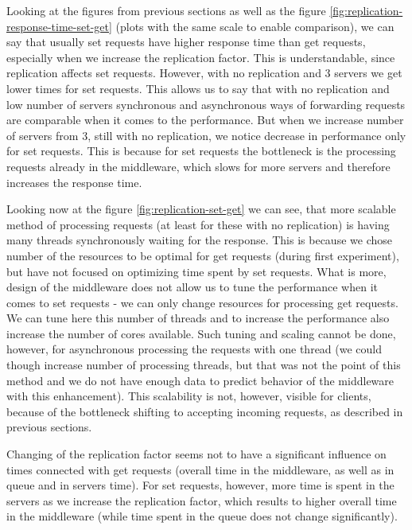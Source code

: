 \documentclass[11pt]{article}
\begin{document}
Looking at the figures from previous sections as well as the figure
\ref{fig:replication-response-time-set-get} (plots with the same scale to enable comparison), we can say that usually set requests have higher response time than get requests, especially when we increase the replication factor. This is understandable, since replication affects set requests. However, with no replication and 3 servers we get lower times for set requests. This allows us to say that with no replication and low number of servers synchronous and asynchronous ways of forwarding requests are comparable when it comes to the performance. But when we increase number of servers from 3, still with no replication, we notice decrease in performance only for set requests. This is because for set requests the bottleneck is the processing requests already in the middleware, which slows for more servers and therefore increases the response time. 

Looking now at the figure \ref{fig:replication-set-get} we can see, that more scalable method of processing requests (at least for these with no replication) is having many threads synchronously waiting for the response. This is because we chose number of the resources to be optimal for get requests (during first experiment), but have not focused on optimizing time spent by set requests. What is more, design of the middleware does not allow us to tune the performance when it comes to set requests - we can only change resources for processing get requests.  We can tune here this number of threads and to increase the performance also increase the number of cores available. Such tuning and scaling cannot be done, however, for asynchronous processing the requests with one thread (we could though increase number of processing threads, but that was not the point of this method and we do not have enough data to predict behavior of the middleware with this enhancement). This scalability is not, however, visible for clients, because of the bottleneck shifting to accepting incoming requests, as described in previous sections.

Changing of the replication factor seems not to have a significant influence on times connected with get requests (overall time in the middleware, as well as in queue and in servers time). For set requests, however, more time is spent in the servers as we increase the replication factor, which results to higher overall time in the middleware (while time spent in the queue does not change significantly).
\end{document}
